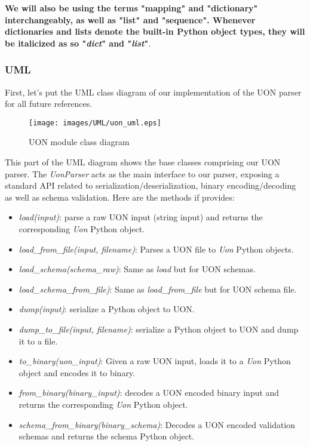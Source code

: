 \documentclass[12pt]{article}
\begin{document}
\textbf{We will also be using the terms "mapping" and "dictionary" interchangeably, as well as "list" and "sequence". Whenever dictionaries and lists denote the built-in Python object types, they will be italicized as so "\emph{dict}" and "\emph{list}"}.

\subsubsection{UML}
First, let's put the UML class diagram of our implementation of the UON parser for all future references.

\begin{figure}[ht!]
 	\centering
 	\caption{UON module class diagram}
 	\texttt{[image: images/UML/uon\_uml.eps]}
 	\label{fig:uon_uml}
\end{figure}

This part of the UML diagram shows the base classes comprising our UON parser. The \emph{UonParser} acts as the main interface to our parser, exposing a standard API related to serialization/deserialization, binary encoding/decoding as well as schema validation. Here are the methods if provides:
\begin{itemize}
    \item \emph{load(input)}: parse a raw UON input (string input) and returns the corresponding \emph{Uon} Python object.
    \item \emph{load\_from\_file(input, filename)}: Parses a UON file to \emph{Uon} Python objects.
    \item \emph{load\_schema(schema\_raw)}: Same as \emph{load} but for UON schemas.
    \item \emph{load\_schema\_from\_file)}: Same as \emph{load\_from\_file} but for UON schema file.
    \item \emph{dump(input)}: serialize a Python object to UON.
    \item \emph{dump\_to\_file(input, filename)}: serialize a Python object to UON and dump it to a file.
    \item \emph{to\_binary(uon\_input)}: Given a raw UON input, loads it to a \emph{Uon} Python object and encodes it to binary.
    \item \emph{from\_binary(binary\_input)}: decodes a UON encoded binary input and returns the corresponding \emph{Uon} Python object.
    \item \emph{schema\_from\_binary(binary\_schema)}: Decodes a UON encoded validation schemas and returns the schema Python object.
\end{itemize}
\end{document}
